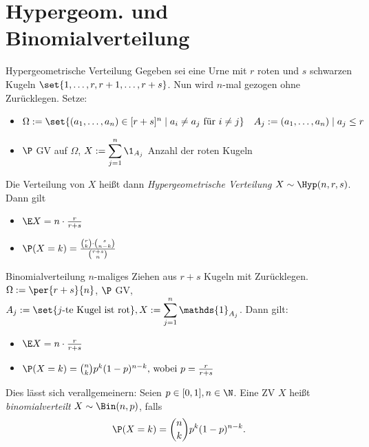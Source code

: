 \section*{Hypergeom. und Binomialverteilung}
 \begin{karte}{Hypergeometrische Verteilung}
	Gegeben sei eine Urne mit $r$ roten und $s$ schwarzen Kugeln 
	$\set{1,\dotsc,r,r+1,\dotsc,r+s}$. 
	Nun wird $n$-mal gezogen ohne Zurücklegen. Setze:
 	\begin{itemize}
		\item $\Omega := \set{(a_1,\dotsc,a_n) \in [r+s]^n 
		\;|\; a_i \neq a_j \text{ für } i \neq j} \quad 
		A_j := {(a_1,\dotsc,a_n) \;|\; a_j \leq r}$
		\item $\P$ GV auf $\Omega$, $\displaystyle 
		X:= \sum_{j=1}^{n} \1_{A_j}$ Anzahl der roten Kugeln
 	\end{itemize}
	Die Verteilung von $X$ heißt dann \textit{Hypergeometrische Verteilung} 
	$X \sim \Hyp(n,r,s)$. Dann gilt
 	\begin{itemize}
 		\item $\E X = n \cdot \frac{r}{r+s}$
 		\item $\P(X=k) = \frac{\binom{r}{k} \cdot \binom{s}{n-k}}{\binom{r+s}{n}}$
 	\end{itemize}
 \end{karte}

\begin{karte}{Binomialverteilung}
	$n$-maliges Ziehen aus $r+s$ Kugeln mit Zurücklegen. 
	$\Omega := \per{r+s}{n}$, $\P$ GV, 
	$A_j:=\set{j\text{-te Kugel ist rot}}, \displaystyle 
	X := \sum_{j=1}^{n} \mathds{1}_{A_j} $. Dann gilt:
	\begin{itemize}
		\item $\E X = n \cdot \frac{r}{r+s}$
		\item $\P(X=k)=\binom{n}{k}p^k(1-p)^{n-k} \text{, wobei } p = \frac{r}{r+s}$ 
	\end{itemize}
	Dies lässt sich verallgemeinern: Seien $p \in [0,1], n \in \N$. 
	Eine ZV $X$ heißt \textit{binomialverteilt} $X \sim \Bin(n,p)$, falls 
	$$\P(X=k)=\binom{n}{k}p^k(1-p)^{n-k} \text{.}$$
\end{karte}